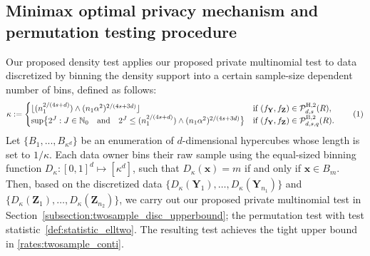 \documentclass[twoside,11pt]{article}
\newcommand\numberthis{\addtocounter{equation}{1}\tag{\theequation}}
\newcommand{\distClassGeneric}{\mathcal{P}}
\newcommand{\rvTwo}{Y}
\newcommand{\rvThree}{Z}
\newcommand{\vectorize}[1]{\mathbf{#1}}
\newcommand{\dimDensity}{d} %
\newcommand{\vectorIndex}{m}
\newcommand{\sampleSize}{n}
\newcommand{\smoothness}{s}
\newcommand{\binner}{D} 	  %
\newcommand{\ballRadius}{R}
\newcommand{\privacyParameter}{\alpha} %
\newcommand{\binNum}{\kappa}           %
\newcommand{\besovParamMicroscope}{q}
\newcommand{\primResLev}{J}
\newcommand{\domainTs}{
	[0,1]^{{\dimDensity}}
}
\newcommand{\pBesovTs}{ %
	\distClassGeneric_{%
		\dimDensity, \smoothness, \besovParamMicroscope
	}^{%
		\mathrm{B,2}
	}
	(\ballRadius)
}
\newcommand{\pHolderTs}{ %
	\distClassGeneric_{%
		\dimDensity, \smoothness
	}^{%
		\mathrm{H,2}
	}
	(\ballRadius)
}
\begin{document}
\subsection{Minimax optimal privacy mechanism and permutation testing procedure}\label{subsection:twosample_conti_upperbound}
Our proposed density test applies our proposed private multinomial test to data discretized by binning the density support into a certain sample-size dependent number of bins, defined as follows: 
\begin{align*}
	\binNum 
	:=
	\begin{cases}
		\lfloor
		(\sampleSize_1^{2/(4\smoothness+\dimDensity)})
		\wedge
		(\sampleSize_1 \privacyParameter^2)^{2/(4\smoothness+3\dimDensity)}
		\rfloor
		& \text{if}~(f_{\vectorize{\rvTwo}}, f_{\vectorize{\rvThree}}) \in \pHolderTs,
		\\
		\sup 
		\bigl\{
		2^\primResLev
		: \primResLev \in \mathbb{N}_0
		\quad \text{and} \quad
		2^\primResLev
		\leq
		(\sampleSize_1^{2/(4\smoothness+\dimDensity)})
		\wedge
		(\sampleSize_1 \privacyParameter^2)^{2/(4\smoothness+3\dimDensity)}
		\bigr\}
		& \text{if}~(f_{\vectorize{\rvTwo}}, f_{\vectorize{\rvThree}}) \in \pBesovTs.
	\end{cases}
	\numberthis \label{eq:kappaValueTwosample}
\end{align*}
Let $\{B_1,...,B_{ \binNum^{\dimDensity}} \}$ be an enumeration of $\dimDensity$-dimensional hypercubes whose length is set to $1/\binNum$.
Each data owner bins their raw sample using the equal-sized binning function $\binner_{\binNum} : \domainTs \mapsto [\binNum^\dimDensity]$, such that $\binner_{\binNum}(\vectorize{x}) = \vectorIndex$ if and only if $\vectorize{x} \in B_\vectorIndex$.
Then, based on the discretized data $\{\binner_{\binNum}(\mathbf{Y}_1), \dots, \binner_{\binNum}(\mathbf{Y}_{n_1})\}$ and $\{\binner_{\binNum}(\mathbf{Z}_1), \dots, \binner_{\binNum}(\mathbf{Z}_{n_2})\}$, we carry out our proposed private multinomial test in Section~\ref{subsection:twosample_disc_upperbound}; the permutation test with test statistic~\eqref{def:statistic_elltwo}. The resulting test achieves the tight upper bound in \eqref{rates:twosample_conti}.
\end{document}
